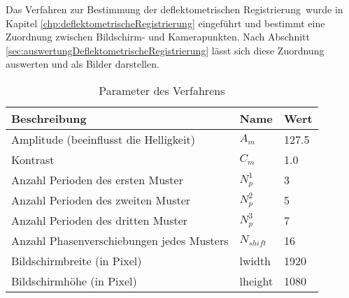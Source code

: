Das Verfahren zur Bestimmung der \glqq deflektometrischen Registrierung\grqq ~wurde in Kapitel \ref{chp:deflektometrischeRegistrierung} eingeführt und bestimmt eine Zuordnung zwischen Bildschirm- und Kamerapunkten.
Nach Abschnitt \ref{sec:auswertungDeflektometrischeRegistrierung} lässt sich diese Zuordnung auswerten und als Bilder darstellen.

\begin{table}[H]
	\centering
	\label{tab:paramDeflektometrischRegistrierung}
	\begin{tabular}{lll}
	\hline 
	\textbf{Beschreibung} & \textbf{Name} & \textbf{Wert} \\ 
	\hline 
	Amplitude (beeinflusst die Helligkeit) & $A_m$ & 127.5 \\
	Kontrast & $C_m$ & 1.0 \\
	Anzahl Perioden des ersten Muster & $N_p^1$ & 3 \\ 
	Anzahl Perioden des zweiten Muster & $N_p^2$ & 5 \\ 
	Anzahl Perioden des dritten Muster & $N_p^3$ & 7 \\  
	Anzahl Phasenverschiebungen jedes Musters & $N_{shift}$ & 16 \\ 
	Bildschirmbreite (in Pixel) & \acrshort{lwidth} & 1920 \\
	Bildschirmhöhe (in Pixel) & \acrshort{lheight} & 1080 \\
	\hline 
	\end{tabular} 
	\caption{Parameter des Verfahrens}
\end{table}